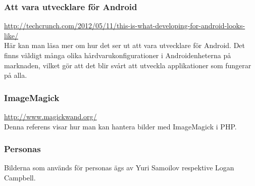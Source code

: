 \subsubsection{Att vara utvecklare för Android}
\url{http://techcrunch.com/2012/05/11/this-is-what-developing-for-android-looks-like/} \\
Här kan man läsa mer om hur det ser ut att vara utvecklare för Android. Det finns väldigt många olika hårdvarukonfigurationer i Androidenheterna på marknaden, vilket gör att det blir svårt att utveckla applikationer som fungerar på alla.

\subsubsection{ImageMagick}
\url{http://www.magickwand.org/} \\
Denna referens visar hur man kan hantera bilder med ImageMagick i PHP.

\subsubsection{Personas}
Bilderna som används för personas ägs av Yuri Samoilov respektive Logan Campbell.
